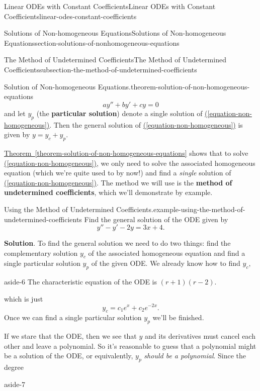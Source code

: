 \documentclass[oneside,10pt,]{book}
\newcommand{\terminology}[1]{\textbf{#1}}
\numberwithin{equation}{section}
\begin{document}
\begin{chapterptx}{Linear ODEs with Constant Coefficients}{}{Linear ODEs with Constant Coefficients}{}{}{linear-odes-constant-coefficients}
\begin{sectionptx}{Solutions of Non-homogeneous Equations}{}{Solutions of Non-homogeneous Equations}{}{}{section-solutions-of-nonhomogeneous-equations}
\begin{subsectionptx}{The Method of Undetermined Coefficients}{}{The Method of Undetermined Coefficients}{}{}{subsection-the-method-of-undetermined-coefficients}
\begin{theorem}{Solution of Non-homogeneous Equations.}{}{theorem-solution-of-non-homogeneous-equations}
\begin{equation*}
ay'' + by' + cy = 0
\end{equation*}
and let \(y_{p}\) (the \terminology{particular solution}) denote a single solution of \hyperref[equation-non-homogeneous]{(\ref{equation-non-homogeneous})}. Then the general solution of \hyperref[equation-non-homogeneous]{(\ref{equation-non-homogeneous})} is given by \(y = y_{c} + y_{p}\).%
\end{theorem}
\hypertarget{p-226}{}%
\hyperref[theorem-solution-of-non-homogeneous-equations]{Theorem~\ref{theorem-solution-of-non-homogeneous-equations}} shows that to solve \hyperref[equation-non-homogeneous]{(\ref{equation-non-homogeneous})}, we only need to solve the associated homogeneous equation (which we're quite used to by now!) and find a \emph{single} solution of \hyperref[equation-non-homogeneous]{(\ref{equation-non-homogeneous})}. The method we will use is the \terminology{method of undetermined coefficients}, which we'll demonstrate by example.%
\begin{example}{Using the Method of Undetermined Coefficients.}{example-using-the-method-of-undetermined-coefficients}%
\hypertarget{p-227}{}%
Find the general solution of the ODE given by%
\begin{equation*}
y'' - y' - 2y = 3x + 4.
\end{equation*}
%
\par\smallskip%
\noindent\textbf{Solution}.\hypertarget{solution-32}{}\quad%
\hypertarget{p-228}{}%
To find the general solution we need to do two things: find the complementary solution \(y_{c}\) of the associated homogeneous equation and find a single particular solution \(y_{p}\) of the given ODE. We already know how to find \(y_{c},\)\begin{aside}{}{aside-6}%
\hypertarget{p-229}{}%
The characteristic equation of the ODE is \((r + 1)(r - 2)\).%
\end{aside}
 which is just%
\begin{equation*}
y_{c} = c_{1}e^{x} + c_{2}e^{-2x}.
\end{equation*}
Once we can find a single particular solution \(y_{p}\) we'll be finished.%
\par
\hypertarget{p-230}{}%
If we stare that the ODE, then we see that \(y\) and its derivatives must cancel each other and leave a polynomial. So it's reasonable to guess that a polynomial might be a solution of the ODE, or equivalently, \(y_{p}\) \emph{should be a polynomial}. Since the degree\begin{aside}{}{aside-7}%

\end{aside}
\end{example}
\end{subsectionptx}
\end{sectionptx}
\end{chapterptx}
\end{document}
